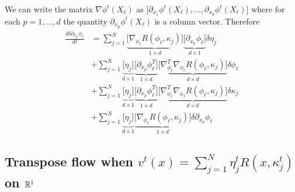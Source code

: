 \documentclass[noinfoline]{imsart}
\begin{document}
{We can write the matrix $\nabla \phi^t(X_\ell)$ as $\bigl[\partial_{x_1}\phi^t(X_\ell), \ldots,\partial_{x_d}\phi^t(X_\ell )\bigr]$ where for each $p=1,\ldots, d$ the quantity $\partial_{x_p}\phi^t(X_\ell)$ is a column vector. Therefore
\begin{align*}
\frac{d\delta\partial_{x_p}\phi_\ell}{dt}
&= \sum_{j=1}^N\underbrace{\bigl[ \nabla_{\phi_\ell}R(\phi_\ell,\kappa_j)\bigr]}_{1\times d} \underbrace{\bigl[\partial_{x_p}{\phi}_\ell \bigr]}_{d \times 1}  \delta\eta_j \\
&+ \sum_{j=1}^N \underbrace{\bigl[ \eta_j\bigr]}_{d\times 1} \underbrace{\bigl[\partial_{x_p} {\phi_\ell^T}\bigr]}_{1\times d} \underbrace{\bigl[\nabla_{\phi_\ell}^T\nabla_{\phi_\ell}R(\phi_\ell,\kappa_j)\bigr]}_{d\times d}  \delta\phi_\ell  \\
&+ \sum_{j=1}^N \underbrace{\bigl[\eta_j\bigr]}_{d\times 1}   \underbrace{\bigl[\partial_{x_p} {\phi_\ell^T}\bigr]}_{1\times d}  \underbrace{\bigl[\nabla^T_{\phi_\ell}\nabla_{\kappa_j}R(\phi_\ell,\kappa_j)\bigr]}_{d\times d}  \delta\kappa_j    \\
&+ \sum_{j=1}^N \underbrace{\bigl[\eta_j\bigr]}_{d\times 1} \underbrace{\bigl[ \nabla_{\phi_\ell}R(\phi_\ell,\kappa_j)\bigr]}_{1\times d} \delta\partial_{x_p} {\phi}_\ell
\end{align*}


\subsection{Transpose flow when  $v^t(x)=\sum_{j=1}^N \eta^t_j R(x,\kappa^t_j) $ on $\Bbb R^1$}

}
\end{document}
